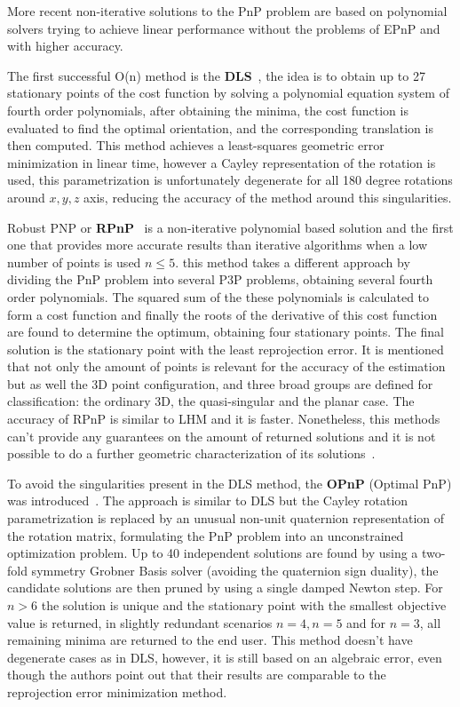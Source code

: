 \documentclass[letterpaper, 10 pt, conference]{ieeeconf}  %
\begin{document}
	More recent non-iterative solutions to the PnP problem are based on polynomial solvers trying to achieve linear performance without the problems of EPnP and with higher accuracy. 
	
	The first successful O(n) method is the \textbf{DLS}~\cite{Hesch2011}, the idea is to obtain up to 27 stationary points of the cost function by solving a polynomial equation system of fourth order polynomials, after obtaining the minima, the cost function is evaluated to find the optimal orientation, and the corresponding translation is then computed. This method achieves a least-squares geometric error minimization in linear time, however a Cayley representation of the rotation is used, this parametrization is unfortunately degenerate for all 180 degree rotations around $x,y,z$ axis, reducing the accuracy of the method around this singularities. %
	
	Robust PNP or \textbf{RPnP}~\cite{Li2012} is a non-iterative polynomial based solution and the first one that provides more accurate results than iterative algorithms when a low number of points is used $n ≤ 5$. this method takes a different approach by dividing the PnP problem into several P3P problems, obtaining several fourth order polynomials. The squared sum of the these polynomials is calculated to form a cost function and finally the roots of the derivative of this cost function are found to determine the optimum, obtaining four stationary points. The final solution is the stationary point with the least reprojection error. It is mentioned that not only the amount of points is relevant for the accuracy of the estimation but as well the 3D point configuration, and three broad groups are defined for classification: the ordinary 3D, the quasi-singular and the planar case. The accuracy of RPnP is similar to LHM and it is faster. Nonetheless, this methods can't provide any guarantees on the amount of returned solutions and it is not possible to do a further geometric characterization of its solutions~\cite{Collins2014}.
	
	To avoid the singularities present in the DLS method, the \textbf{OPnP} (Optimal PnP) was introduced~\cite{Zheng2013}. The approach is similar to DLS but the Cayley rotation parametrization is replaced by an unusual non-unit quaternion representation of the rotation matrix, formulating the PnP problem into an unconstrained optimization problem. Up to 40 independent solutions are found by using a two-fold symmetry Grobner Basis solver (avoiding the quaternion sign duality), the candidate solutions are then pruned by using a single damped Newton step. For $n>6$ the solution is unique and the stationary point with the smallest objective value is returned, in slightly redundant scenarios $n = 4, n = 5$ and for $n=3$, all remaining minima are returned to the end user. This method doesn't have degenerate cases as in DLS, however, it is still based on an algebraic error, even though the authors point out that their results are comparable to the reprojection error minimization method. %
	
\end{document}
